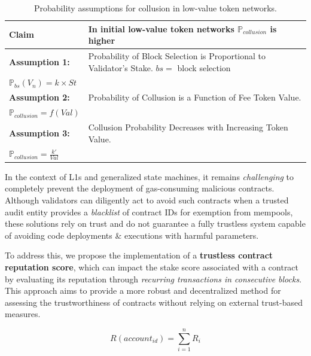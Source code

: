 \documentclass{article}
\begin{document}
\begin{table}[h]
    \centering
    \renewcommand{\arraystretch}{1.5}
    \setlength{\tabcolsep}{10pt}
    \begin{tabular}{|p{}|p{}|}
        \hline
        \textbf{Claim} & In initial low-value token networks $\mathbb{P}_{collusion}$ is higher \\
        \hline
        \textbf{Assumption 1:} & Probability of Block Selection is Proportional to Validator's Stake. $bs =$ block selection \\
        $\mathbb{P}_{bs} (V_n) = k \times St$ & \\
        \hline
        \textbf{Assumption 2:} & Probability of Collusion is a Function of Fee Token Value. \\
        $\mathbb{P}_{collusion} = f(Val)$ & \\
        \hline
        \textbf{Assumption 3:} & Collusion Probability Decreases with Increasing Token Value. \\
        $\mathbb{P}_{collusion} = \frac{k'}{Val}$ & \\
        \hline
    \end{tabular}
    \caption{Probability assumptions for collusion in low-value token networks.}
    \label{tab:collusion_probabilities}
\end{table}

In the context of L1s and generalized state machines, it remains \textit{challenging} to completely prevent the deployment of gas-consuming malicious contracts. Although validators can diligently act to avoid such contracts when a trusted audit entity provides a \textit{blacklist} of contract IDs for exemption from mempools, these solutions rely on trust and do not guarantee a fully trustless system capable of avoiding code deployments \& executions with harmful parameters.

To address this, we propose the implementation of a \textbf{trustless contract reputation score}, which can impact the stake score associated with a contract by evaluating its reputation through \textit{recurring transactions in consecutive blocks}. This approach aims to provide a more robust and decentralized method for assessing the trustworthiness of contracts without relying on external trust-based measures.

\begin{equation}
R(account_{id})  = \sum_{i=1}^{n} R_i
\end{equation}
\end{document}
